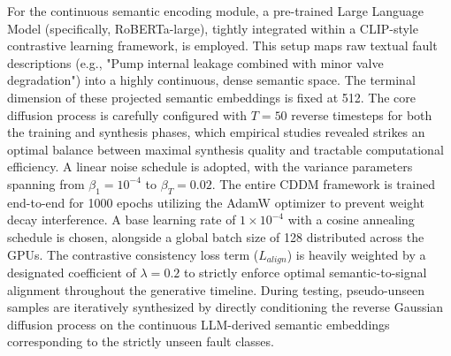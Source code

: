 For the continuous semantic encoding module, a pre-trained Large Language Model (specifically, RoBERTa-large), tightly integrated within a CLIP-style contrastive learning framework, is employed. This setup maps raw textual fault descriptions (e.g., "Pump internal leakage combined with minor valve degradation") into a highly continuous, dense semantic space. The terminal dimension of these projected semantic embeddings is fixed at 512. 
The core diffusion process is carefully configured with $T = 50$ reverse timesteps for both the training and synthesis phases, which empirical studies revealed strikes an optimal balance between maximal synthesis quality and tractable computational efficiency. A linear noise schedule is adopted, with the variance parameters spanning from $\beta_1 = 10^{-4}$ to $\beta_T = 0.02$. The entire CDDM framework is trained end-to-end for 1000 epochs utilizing the AdamW optimizer to prevent weight decay interference. A base learning rate of $1 \times 10^{-4}$ with a cosine annealing schedule is chosen, alongside a global batch size of 128 distributed across the GPUs. The contrastive consistency loss term ($L_{align}$) is heavily weighted by a designated coefficient of $\lambda = 0.2$ to strictly enforce optimal semantic-to-signal alignment throughout the generative timeline. During testing, pseudo-unseen samples are iteratively synthesized by directly conditioning the reverse Gaussian diffusion process on the continuous LLM-derived semantic embeddings corresponding to the strictly unseen fault classes.

